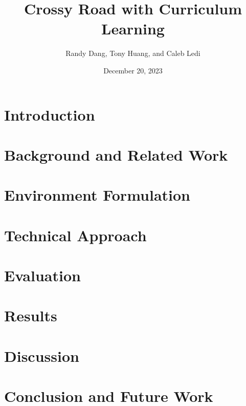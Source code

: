 \documentclass{article}
\title{Crossy Road with Curriculum Learning}
\author{Randy Dang, Tony Huang, and Caleb Ledi}
\date{December 20, 2023}
\begin{document}
\maketitle

\tableofcontents 

\pagebreak 

\section{Introduction}

\cite{cs221poster}

\section{Background and Related Work}

\section{Environment Formulation}

\section{Technical Approach}

\section{Evaluation}

\section{Results}

\section{Discussion}

\section{Conclusion and Future Work}


\pagebreak

\printbibliography
\end{document}
